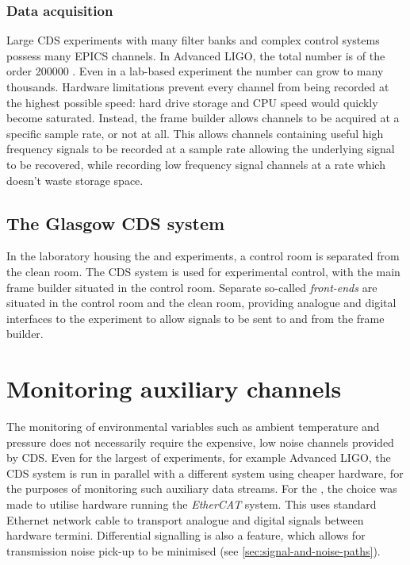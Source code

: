 \subsubsection{Data acquisition}
Large \gls{CDS} experiments with many filter banks and complex control systems possess many \gls{EPICS} channels. In Advanced LIGO, the total number is of the order \num{200000} \cite{aligonoise2016}. Even in a lab-based experiment the number can grow to many thousands. Hardware limitations prevent every channel from being recorded at the highest possible speed: hard drive storage and \gls{CPU} speed would quickly become saturated. Instead, the frame builder allows channels to be acquired at a specific sample rate, or not at all. This allows channels containing useful high frequency signals to be recorded at a sample rate allowing the underlying signal to be recovered, while recording low frequency signal channels at a rate which doesn't waste storage space.

\subsection{The Glasgow CDS system}
In the laboratory housing the \GLASGOWTENM{} and \SSM{} experiments, a control room is separated from the clean room. The \gls{CDS} system is used for experimental control, with the main frame builder situated in the control room. Separate so-called \emph{front-ends} are situated in the control room and the clean room, providing analogue and digital interfaces to the experiment to allow signals to be sent to and from the frame builder.

\section{Monitoring auxiliary channels}
The monitoring of environmental variables such as ambient temperature and pressure does not necessarily require the expensive, low noise channels provided by \gls{CDS}. Even for the largest of experiments, for example Advanced LIGO, the \gls{CDS} system is run in parallel with a different system using cheaper hardware, for the purposes of monitoring such auxiliary data streams. For the \SSMEXPT{}, the choice was made to utilise hardware running the \emph{EtherCAT} system. This uses standard Ethernet network cable to transport analogue and digital signals between hardware termini. Differential signalling is also a feature, which allows for transmission noise pick-up to be minimised (see \ref{sec:signal-and-noise-paths}).

